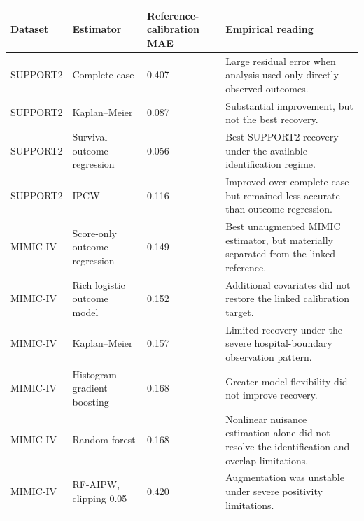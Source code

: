 \begin{tabular}{llll}
\toprule
Dataset & Estimator & Reference-calibration MAE & Empirical reading \\
\midrule
SUPPORT2 & Complete case & 0.407 & Large residual error when analysis used only directly observed outcomes. \\
SUPPORT2 & Kaplan–Meier & 0.087 & Substantial improvement, but not the best recovery. \\
SUPPORT2 & Survival outcome regression & 0.056 & Best SUPPORT2 recovery under the available identification regime. \\
SUPPORT2 & IPCW & 0.116 & Improved over complete case but remained less accurate than outcome regression. \\
MIMIC-IV & Score-only outcome regression & 0.149 & Best unaugmented MIMIC estimator, but materially separated from the linked reference. \\
MIMIC-IV & Rich logistic outcome model & 0.152 & Additional covariates did not restore the linked calibration target. \\
MIMIC-IV & Kaplan–Meier & 0.157 & Limited recovery under the severe hospital-boundary observation pattern. \\
MIMIC-IV & Histogram gradient boosting & 0.168 & Greater model flexibility did not improve recovery. \\
MIMIC-IV & Random forest & 0.168 & Nonlinear nuisance estimation alone did not resolve the identification and overlap limitations. \\
MIMIC-IV & RF-AIPW, clipping 0.05 & 0.420 & Augmentation was unstable under severe positivity limitations. \\
\bottomrule
\end{tabular}
